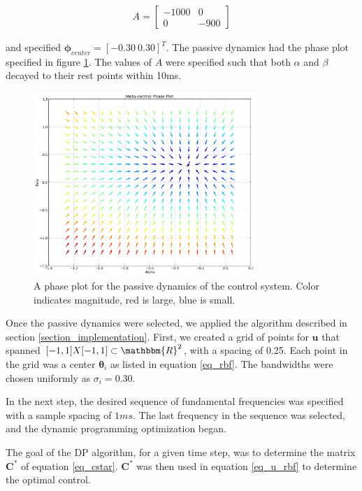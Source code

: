 \documentclass{article} %
\begin{document}
\begin{align*}
A = \left[ \begin{array}{cc} -1000 & 0 \\ 0 & -900 \end{array} \right]
\end{align*}

and specified $\bm{\phi}_{center} = \left[ -0.30 ~ 0.30 \right] ^T$. The passive
dynamics had the phase plot specified in figure \ref{fig:phase_plot}. The values
of $A$ were specified such that both $\alpha$ and $\beta$ decayed to their rest
points within 10ms.

\begin{figure}[h]
\centering
\includegraphics[width=0.75\textwidth]{images/passive_phase_plot.png}
\caption{A phase plot for the passive dynamics of the control system. Color indicates magnitude, red is large, blue is small.}
\label{fig:phase_plot}
\end{figure}

Once the passive dynamics were selected, we applied the algorithm described in section
\ref{section_implementation}. First, we created a grid of points for $\bm{u}$ that
spanned $[-1,1] X [-1, 1] \subset \mathbbm{R}^2$, with a spacing of 0.25. Each point
in the grid was a center $\bm{\theta}_i$ as listed in equation \eqref{eq_rbf}. The bandwidths
were chosen uniformly as $\sigma_i = 0.30$.

In the next step, the desired sequence of fundamental frequencies was specified with
a sample spacing of $1ms$. The last frequency in the sequence was selected, and the
dynamic programming optimization began.

The goal of the DP algorithm, for a given time step, was to determine the matrix
$\bm{C}^*$ of equation \eqref{eq_cstar}. $\bm{C}^*$ was then used in equation 
\eqref{eq_u_rbf} to determine the optimal control.
\end{document}
